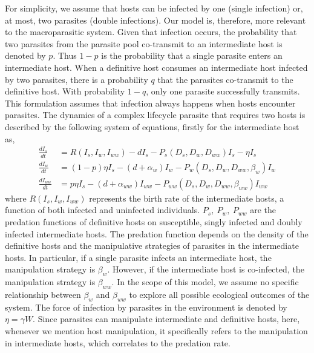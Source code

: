 \documentclass[a4paper]{scrartcl}
\begin{document}
For simplicity, we assume that hosts can be infected by one (single infection) or, at most, two parasites (double infections). 
Our model is, therefore, more relevant to the macroparasitic system.
Given that infection occurs, the probability that two parasites from the parasite pool co-transmit to an intermediate host is denoted by  $p$. Thus $1-p$ is the probability that a single parasite enters an intermediate host. 
When a definitive host consumes an intermediate host infected by two parasites, there is a probability $q$ that the parasites co-transmit to the definitive host.
With probability $1-q$, only one parasite successfully transmits. 
This formulation assumes that infection always happens when hosts encounter parasites.
The dynamics of a complex lifecycle parasite that requires two hosts is described by the following system of equations, firstly for the intermediate host as,
%
\begin{align}
\frac{dI_s}{dt} &= R(I_s, I_w, I_{ww}) - d I_s - P_s(D_s, D_w, D_{ww}) I_s  - \eta  I_s \nonumber \\ 
\frac{dI_w}{dt} &=  (1 - p) \eta I_s  - (d + \alpha_w) I_w - P_w(D_s, D_w, D_{ww}, \beta_w) I_w \label{odes:ihosts} \\
\frac{dI_{ww}}{dt} &= p \eta I_s  - (d + \alpha_{ww}) I_{ww} - P_{ww}(D_s, D_w, D_{ww}, \beta_{ww}) I_{ww} \nonumber
\end{align}
%
where $R(I_s, I_w, I_{ww})$ represents the birth rate of the intermediate hosts, a function of both infected and uninfected individuals.
$P_s, \ P_w, \ P_{ww}$ are the predation functions of definitive hosts on susceptible, singly infected and doubly infected intermediate hosts. 
The predation function depends on the density of the definitive hosts and the manipulative strategies of parasites in the intermediate hosts. 
In particular, if a single parasite infects an intermediate host, the manipulation strategy is $\beta_w$. 
However, if the intermediate host is co-infected, the manipulation strategy is $\beta_{ww}$. 
In the scope of this model, we assume no specific relationship between $\beta_w$ and $\beta_{ww}$ to explore all possible ecological outcomes of the system. 
The force of infection by parasites in the environment is denoted by $\eta = \gamma W$. 
Since parasites can manipulate intermediate and definitive hosts, here, whenever we mention host manipulation, it specifically refers to the manipulation in intermediate hosts, which correlates to the predation rate.
\end{document}
